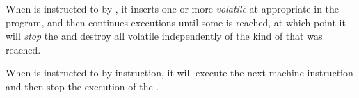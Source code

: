 When \sysname{} is instructed to \step{} by \pollpoint{}, it inserts
one or more \emph{volatile \breakpoints{}} at appropriate
\pollpoints{} in the program, and then continues executions until some
\breakpoint{} is reached, at which point it will \emph{stop}
the \applicationthread{} and destroy all volatile \breakpoints{}
independently of the kind of \breakpoint{} that was reached.

When \sysname{} is instructed to \step{} by instruction, it will
execute the next machine instruction and then stop the execution of
the \applicationthread{}.

